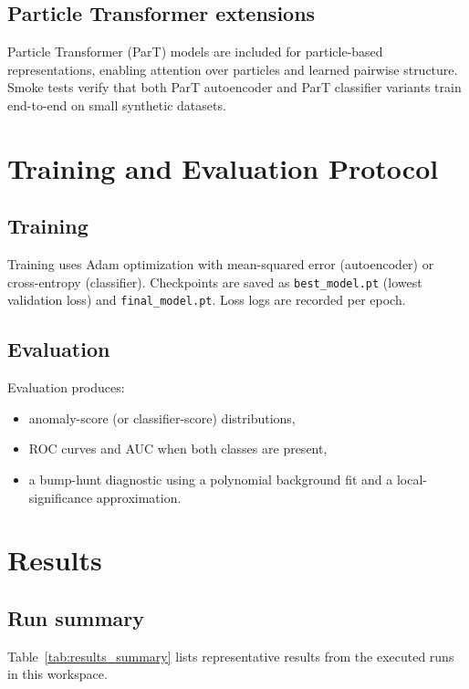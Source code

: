 \documentclass[journal]{IEEEtran}
\begin{document}
\subsection{Particle Transformer extensions}
Particle Transformer (ParT) models are included for particle-based representations, enabling attention over particles and learned pairwise structure. Smoke tests verify that both ParT autoencoder and ParT classifier variants train end-to-end on small synthetic datasets.

\section{Training and Evaluation Protocol}
\subsection{Training}
Training uses Adam optimization with mean-squared error (autoencoder) or cross-entropy (classifier). Checkpoints are saved as \texttt{best\_model.pt} (lowest validation loss) and \texttt{final\_model.pt}. Loss logs are recorded per epoch.

\subsection{Evaluation}
Evaluation produces:
\begin{itemize}
\item anomaly-score (or classifier-score) distributions,
\item ROC curves and AUC when both classes are present,
\item a bump-hunt diagnostic using a polynomial background fit and a local-significance approximation.
\end{itemize}

\section{Results}
\subsection{Run summary}
Table~\ref{tab:results_summary} lists representative results from the executed runs in this workspace.

\begin{table}[H]
\centering
\caption{Summary of representative training/evaluation runs. AUC is reported only when both background and signal labels are present.}
\label{tab:results_summary}
\end{table}
\end{document}
